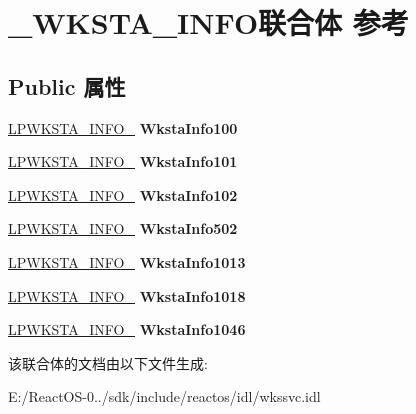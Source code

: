 \hypertarget{union___w_k_s_t_a___i_n_f_o}{}\section{\+\_\+\+W\+K\+S\+T\+A\+\_\+\+I\+N\+F\+O联合体 参考}
\label{union___w_k_s_t_a___i_n_f_o}
\subsection*{Public 属性}
\begin{DoxyCompactItemize}
\item 
\mbox{\label{union___w_k_s_t_a___i_n_f_o_a9cc69851dc9873d9a0ad5707c5e7d03e}} 
\hyperlink{struct___w_k_s_t_a___i_n_f_o__100}{L\+P\+W\+K\+S\+T\+A\+\_\+\+I\+N\+F\+O\+\_} {\bfseries Wksta\+Info100}
\item 
\mbox{\label{union___w_k_s_t_a___i_n_f_o_a2f7f49f33b81fcf0bcdbda5ccc0a9746}} 
\hyperlink{struct___w_k_s_t_a___i_n_f_o__101}{L\+P\+W\+K\+S\+T\+A\+\_\+\+I\+N\+F\+O\+\_} {\bfseries Wksta\+Info101}
\item 
\mbox{\label{union___w_k_s_t_a___i_n_f_o_a776df0eebc08c65769e81f65e380436b}} 
\hyperlink{struct___w_k_s_t_a___i_n_f_o__102}{L\+P\+W\+K\+S\+T\+A\+\_\+\+I\+N\+F\+O\+\_} {\bfseries Wksta\+Info102}
\item 
\mbox{\label{union___w_k_s_t_a___i_n_f_o_a9af4136104fd861a7f72a2f6c249fd6d}} 
\hyperlink{struct___w_k_s_t_a___i_n_f_o__502}{L\+P\+W\+K\+S\+T\+A\+\_\+\+I\+N\+F\+O\+\_} {\bfseries Wksta\+Info502}
\item 
\mbox{\label{union___w_k_s_t_a___i_n_f_o_ac768bc0f4b5cbf2d57bcc04451ba29c7}} 
\hyperlink{struct___w_k_s_t_a___i_n_f_o__1013}{L\+P\+W\+K\+S\+T\+A\+\_\+\+I\+N\+F\+O\+\_} {\bfseries Wksta\+Info1013}
\item 
\mbox{\label{union___w_k_s_t_a___i_n_f_o_ae359f7ed182589d02b8ee0ae82747baf}} 
\hyperlink{struct___w_k_s_t_a___i_n_f_o__1018}{L\+P\+W\+K\+S\+T\+A\+\_\+\+I\+N\+F\+O\+\_} {\bfseries Wksta\+Info1018}
\item 
\mbox{\label{union___w_k_s_t_a___i_n_f_o_a1683f684fa53d97b06a7b02c26b9ccfb}} 
\hyperlink{struct___w_k_s_t_a___i_n_f_o__1046}{L\+P\+W\+K\+S\+T\+A\+\_\+\+I\+N\+F\+O\+\_} {\bfseries Wksta\+Info1046}
\end{DoxyCompactItemize}


该联合体的文档由以下文件生成\+:\begin{DoxyCompactItemize}
\item 
E\+:/\+React\+O\+S-\/0../sdk/include/reactos/idl/wkssvc.\+idl\end{DoxyCompactItemize}
